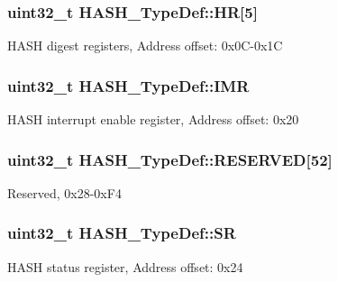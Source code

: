 \subsubsection[{\texorpdfstring{HR}{HR}}]{ uint32\+\_\+t H\+A\+S\+H\+\_\+\+Type\+Def\+::\+HR\mbox{[}5\mbox{]}}\hypertarget{struct_h_a_s_h___type_def_acb0d3ac4cdf8c478ca0ffeebadc04840}{}\label{struct_h_a_s_h___type_def_acb0d3ac4cdf8c478ca0ffeebadc04840}
H\+A\+SH digest registers, Address offset\+: 0x0\+C-\/0x1C 
\subsubsection[{\texorpdfstring{I\+MR}{IMR}}]{ uint32\+\_\+t H\+A\+S\+H\+\_\+\+Type\+Def\+::\+I\+MR}\hypertarget{struct_h_a_s_h___type_def_a01011d00eb28b8798af8c5dfedf6f35d}{}\label{struct_h_a_s_h___type_def_a01011d00eb28b8798af8c5dfedf6f35d}
H\+A\+SH interrupt enable register, Address offset\+: 0x20 
\subsubsection[{\texorpdfstring{R\+E\+S\+E\+R\+V\+ED}{RESERVED}}]{\setlength{\rightskip}{0pt plus 5cm}uint32\+\_\+t H\+A\+S\+H\+\_\+\+Type\+Def\+::\+R\+E\+S\+E\+R\+V\+ED\mbox{[}52\mbox{]}}\hypertarget{struct_h_a_s_h___type_def_a9f95e7cb8f85cae58cc429e14e96f663}{}\label{struct_h_a_s_h___type_def_a9f95e7cb8f85cae58cc429e14e96f663}
Reserved, 0x28-\/0x\+F4 
\subsubsection[{\texorpdfstring{SR}{SR}}]{ uint32\+\_\+t H\+A\+S\+H\+\_\+\+Type\+Def\+::\+SR}\hypertarget{struct_h_a_s_h___type_def_a8af8c27ac134cbeb13af4e4e856de537}{}\label{struct_h_a_s_h___type_def_a8af8c27ac134cbeb13af4e4e856de537}
H\+A\+SH status register, Address offset\+: 0x24 
